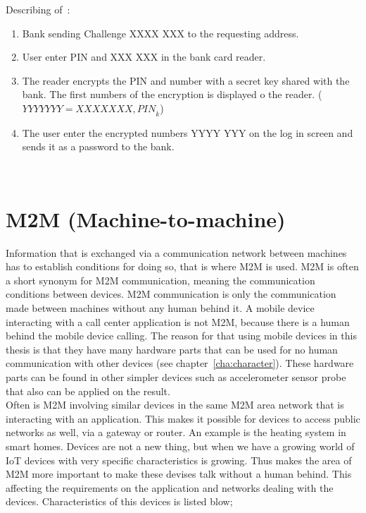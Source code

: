 Describing of~:
\begin{enumerate}
	\item Bank sending Challenge XXXX XXX to the requesting address.
	\item User enter PIN and XXX XXX in the bank card reader.
	\item The reader encrypts the PIN and number with a secret key shared with the bank. The first numbers of the encryption is displayed o the reader. ($YYYY YYY = {XXXX XXX, PIN}_k$) 
	\item The user enter the encrypted numbers YYYY YYY on the log in screen and sends it as a password to the bank.
\end{enumerate}
~\cite[ch.3]{rosssec}

\section{M2M (Machine-to-machine)}\label{sec:m2mauth}
Information that is exchanged via a communication network between machines has to establish conditions for doing so, that is where M2M is used. M2M is often a short synonym for M2M communication, meaning the communication conditions between devices. M2M communication is only the communication made between machines without any human behind it. A mobile device interacting with a call center application is not M2M, because there is a human behind the mobile device calling. The reason for that using mobile devices in this thesis is that they have many hardware parts that can be used for no human communication with other devices (see chapter~\ref{cha:character}). These hardware parts can be found in other simpler devices such as accelerometer sensor probe that also can be applied on the result.
\\
Often is M2M involving similar devices in the same M2M area network that is interacting with an application. This makes it possible for devices to access public networks as well, via a gateway or router. An example is the heating system in smart homes. 
Devices are not a new thing, but when we have a growing world of IoT devices with very specific characteristics is growing. Thus makes the area of M2M more important to make these devises talk without a human behind. This affecting the requirements on the application and networks dealing with the devices. Characteristics of this devices is listed blow;
